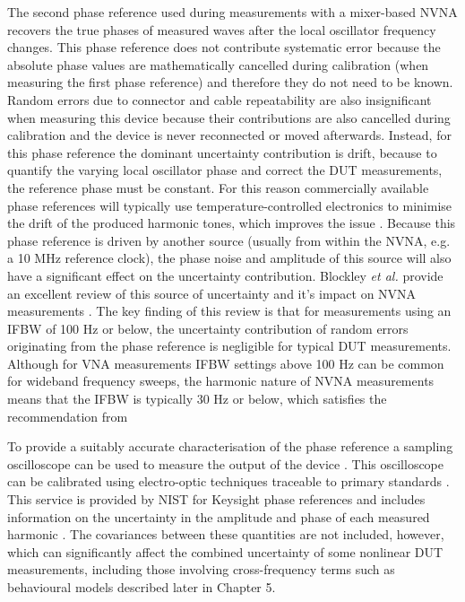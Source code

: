 \documentclass[../thesis/thesis.tex]{subfiles}
\begin{document}
The second phase reference used during measurements with a mixer-based NVNA recovers the true phases of measured waves after the local oscillator frequency changes. This phase reference does not contribute systematic error because the absolute phase values are mathematically cancelled during calibration (when measuring the first phase reference) and therefore they do not need to be known. Random errors due to connector and cable repeatability are also insignificant when measuring this device because their contributions are also cancelled during calibration and the device is never reconnected or moved afterwards. Instead, for this phase reference the dominant uncertainty contribution is drift, because to quantify the varying local oscillator phase and correct the DUT measurements, the reference phase must be constant. For this reason commercially available phase references will typically use temperature-controlled electronics to minimise the drift of the produced harmonic tones, which improves the issue \cite{Jargon_2003}. Because this phase reference is driven by another source (usually from within the NVNA, e.g. a 10 MHz reference clock), the phase noise and amplitude of this source will also have a significant effect on the uncertainty contribution. Blockley \emph{et al.} provide an excellent review of this source of uncertainty and it's impact on NVNA measurements \cite{Blockley_2007}. The key finding of this review is that for measurements using an IFBW of 100 Hz or below, the uncertainty contribution of random errors originating from the phase reference is negligible for typical DUT measurements. Although for VNA measurements IFBW settings above 100 Hz can be common for wideband frequency sweeps, the harmonic nature of NVNA measurements means that the IFBW is typically 30 Hz or below, which satisfies the recommendation from \cite{Blockley_2007}

To provide a suitably accurate characterisation of the phase reference a sampling oscilloscope can be used to measure the output of the device \cite{Reader_2008}. This oscilloscope can be calibrated using electro-optic techniques traceable to primary standards \cite{Williams_2006, Hale_2009}. This service is provided by NIST for Keysight phase references and includes information on the uncertainty in the amplitude and phase of each measured harmonic \cite{Keysight_2017}. The covariances between these quantities are not included, however, which can significantly affect the combined uncertainty of some nonlinear DUT measurements, including those involving cross-frequency terms such as behavioural models described later in Chapter 5.
\end{document}
